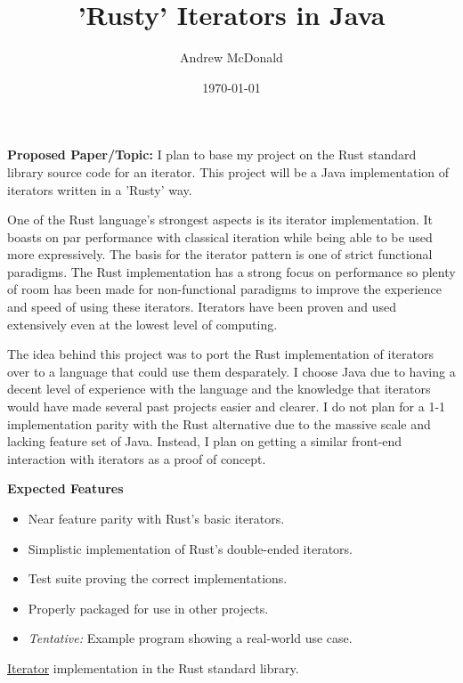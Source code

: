 \documentclass[12pt]{extarticle}
\title{'Rusty' Iterators in Java}
\author{Andrew McDonald}
\date{\today}
\begin{document}
\maketitle

\noindent\textbf{Proposed Paper/Topic:} %
I plan to base my project on the Rust standard library source code for an iterator\cite{HMU}.
This project will be a Java implementation of iterators written in a 'Rusty' way.

One of the Rust language's strongest aspects is its iterator implementation. It boasts on par performance with classical iteration while being able to be used more expressively. The basis for the iterator pattern is one of strict functional paradigms. The Rust implementation has a strong focus on performance so plenty of room has been made for non-functional paradigms to improve the experience and speed of using these iterators. Iterators have been proven and used extensively even at the lowest level of computing.

The idea behind this project was to port the Rust implementation of iterators over to a language that could use them desparately. I choose Java due to having a decent level of experience with the language and the knowledge that iterators would have made several past projects easier and clearer. I do not plan for a 1-1 implementation parity with the Rust alternative due to the massive scale and lacking feature set of Java. Instead, I plan on getting a similar front-end interaction with iterators as a proof of concept. \newline


\noindent\textbf{Expected Features}
\begin{itemize}
  \itemsep0em
  \item Near feature parity with Rust's basic iterators.
  \item Simplistic implementation of Rust's double-ended iterators.
  \item Test suite proving the correct implementations.
  \item Properly packaged for use in other projects.
  \item \textit{Tentative:} Example program showing a real-world use case.
\end{itemize}


\begin{thebibliography}{4}


  \href{https://doc.rust-lang.org/std/iter/trait.Iterator.html}{Iterator} implementation in the Rust standard library.
\end{thebibliography}
\end{document}

